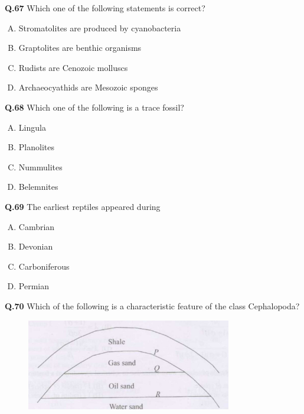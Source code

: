 \textbf{Q.67} Which one of the following statements is correct?
\begin{enumerate}[(A)]
    \item Stromatolites are produced by cyanobacteria
    \item Graptolites are benthic organisms
    \item Rudists are Cenozoic molluscs
    \item Archaeocyathids are Mesozoic sponges
\end{enumerate}

\textbf{Q.68} Which one of the following is a trace fossil?
\begin{multicols}{4}
    

\begin{enumerate}[(A)]
    \item Lingula
    \item Planolites
    \item Nummulites
    \item Belemnites
\end{enumerate}
\end{multicols}
\textbf{Q.69} The earliest reptiles appeared during
\begin{enumerate}[(A)]
    \item Cambrian
    \item Devonian
    \item Carboniferous
    \item Permian
\end{enumerate}

\textbf{Q.70} Which of the following is a characteristic feature of the class Cephalopoda?

\begin{figure}[h] %
    \centering
    \includegraphics[width=0.8\textwidth]{gg_2008 (2)-images-9 ...jpg} %
   
    \label{fig:screenshot}
\end{figure}

